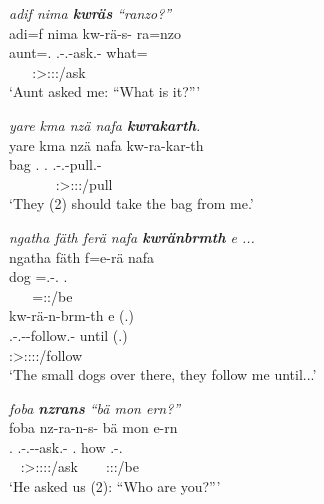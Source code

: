 \begin{exe}
	\ex \emph{adif nima \textbf{kwräs} ``ranzo?''}\\
	\glll adi=f nima kw-rä-s-\Zero{} ra=nzo\\
	aunt=\Erg.\Sg{} \Quot{} \Fsg.\Bet-\Irr.\Ndu-ask.\Rs-\Stsg{} what=\Only\\
	~ ~ {\Stsg:\Sbj>\Fsg:\Obj:\Irr:\Pfv/ask} ~\\
	\trans `Aunt asked me: ``What is it?''' 
	\label{ex243}
\end{exe}
\begin{exe}
	\ex \emph{yare kma nzä nafa \textbf{kwrakarth}.}\\
	\glll yare kma nzä nafa kw-ra-kar-th\\
	bag \Pot{} \Fsg.\Abs{} \Tnsg.\Erg{} \Fsg.\Bet-\Irr.\Du-pull.\Rs-\Stnsg\\
	~ ~ ~ ~ {\Stdu:\Sbj>\Fsg:\Obj:\Irr:\Pfv/pull}\\
	\trans `They (2) should take the bag from me.' 
	\label{ex245}
\end{exe}
\begin{exe}
	\ex \emph{ngatha fäth ferä nafa \textbf{kwränbrmth} e ...}\\
	\glll ngatha fäth f=e-rä nafa\\
	dog \Dim{} \Dist=\Stnsg.\Alph-\Cop.\Ndu{} \Tnsg.\Erg{}\\
	~ ~ {\Dist=\Stpl:\Sbj:\Nonpast/be} ~\\
	\sn
	\glll kw-rä-n-brm-th e (.)\\
	\Fsg{}.\Bet{}-\Irr.\Ndu-\Venit-follow.\Rs-\Stnsg{} until (.)\\
	\footnotesize{\Stpl:\Sbj>\Fsg:\Obj:\Irr:\Pfv:\Venit/follow} ~ ~\\
	\trans `The small dogs over there, they follow me until...' 
	\label{ex246}
\end{exe}
\begin{exe}
	\ex \emph{foba \textbf{nzrans} ``bä mon ern?''}\\
	\glll foba nz-ra-n-s-\Zero{} bä mon e-rn\\
	\Dist.\Abl{} \Fnsg.\Bet-\Irr.\Du-\Venit-ask.\Rs-\Stsg{} \Second.\Abs{} how \Stnsg.\Alph-\Cop.\Du\\
	~ {\Stsg:\Sbj>\Fdu:\Obj:\Irr:\Pfv:\Venit/ask} ~ ~ {\Stdu:\Sbj:\Nonpast:\Ipfv/be}\\
	\trans `He asked us (2): ``Who are you?''' 
	\label{ex248}
\end{exe}
